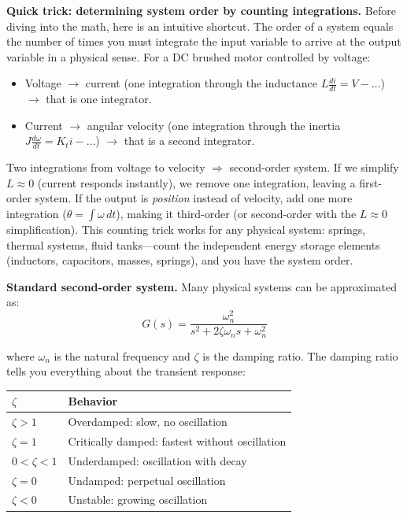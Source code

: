 \textbf{Quick trick: determining system order by counting integrations.} Before diving into the math, here is an intuitive shortcut. The order of a system equals the number of times you must integrate the input variable to arrive at the output variable in a physical sense. For a DC brushed motor controlled by voltage:
\begin{itemize}[nosep]
    \item Voltage $\to$ current (one integration through the inductance $L\frac{di}{dt} = V - \ldots$) $\to$ that is one integrator.
    \item Current $\to$ angular velocity (one integration through the inertia $J\frac{d\omega}{dt} = K_t i - \ldots$) $\to$ that is a second integrator.
\end{itemize}
Two integrations from voltage to velocity $\Rightarrow$ second-order system. If we simplify $L \approx 0$ (current responds instantly), we remove one integration, leaving a first-order system. If the output is \textit{position} instead of velocity, add one more integration ($\theta = \int \omega\,dt$), making it third-order (or second-order with the $L \approx 0$ simplification). This counting trick works for any physical system: springs, thermal systems, fluid tanks---count the independent energy storage elements (inductors, capacitors, masses, springs), and you have the system order.

\textbf{Standard second-order system.} Many physical systems can be approximated as:
\begin{equation}
G(s) = \frac{\omega_n^2}{s^2 + 2\zeta\omega_n s + \omega_n^2}
\end{equation}

where $\omega_n$ is the natural frequency and $\zeta$ is the damping ratio. The damping ratio tells you everything about the transient response:

\begin{center}
\begin{tabular}{ll}
\toprule
$\zeta$ & \textbf{Behavior} \\
\midrule
$\zeta > 1$ & Overdamped: slow, no oscillation \\
$\zeta = 1$ & Critically damped: fastest without oscillation \\
$0 < \zeta < 1$ & Underdamped: oscillation with decay \\
$\zeta = 0$ & Undamped: perpetual oscillation \\
$\zeta < 0$ & Unstable: growing oscillation \\
\bottomrule
\end{tabular}
\end{center}

